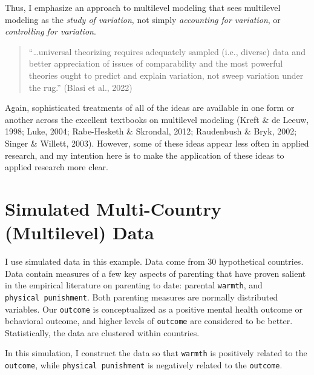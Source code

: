 \documentclass[
  letterpaper,
  DIV=11,
  numbers=noendperiod]{scrreprt}
\begin{document}
Thus, I emphasize an approach to multilevel modeling that sees
multilevel modeling as the \emph{study of variation}, not simply
\emph{accounting for variation}, or \emph{controlling for variation}.

\begin{quote}
``\ldots universal theorizing requires adequately sampled (i.e.,
diverse) data and better appreciation of issues of comparability and the
most powerful theories ought to predict and explain variation, not sweep
variation under the rug.'' (Blasi et al., 2022)
\end{quote}

Again, sophisticated treatments of all of the ideas are available in one
form or another across the excellent textbooks on multilevel modeling
(Kreft \& de Leeuw, 1998; Luke, 2004; Rabe-Hesketh \& Skrondal, 2012;
Raudenbush \& Bryk, 2002; Singer \& Willett, 2003). However, some of
these ideas appear less often in applied research, and my intention here
is to make the application of these ideas to applied research more
clear.


\hypertarget{simulated-multi-country-multilevel-data}{%
\chapter{Simulated Multi-Country (Multilevel)
Data}\label{simulated-multi-country-multilevel-data}}

I use simulated data in this example. Data come from 30 hypothetical
countries. Data contain measures of a few key aspects of parenting that
have proven salient in the empirical literature on parenting to date:
parental \texttt{warmth}, and \texttt{physical\ punishment}. Both
parenting measures are normally distributed variables. Our
\texttt{outcome} is conceptualized as a positive mental health outcome
or behavioral outcome, and higher levels of \texttt{outcome} are
considered to be better. Statistically, the data are clustered within
countries.

In this simulation, I construct the data so that \texttt{warmth} is
positively related to the \texttt{outcome}, while
\texttt{physical\ punishment} is negatively related to the
\texttt{outcome}.
\end{document}

